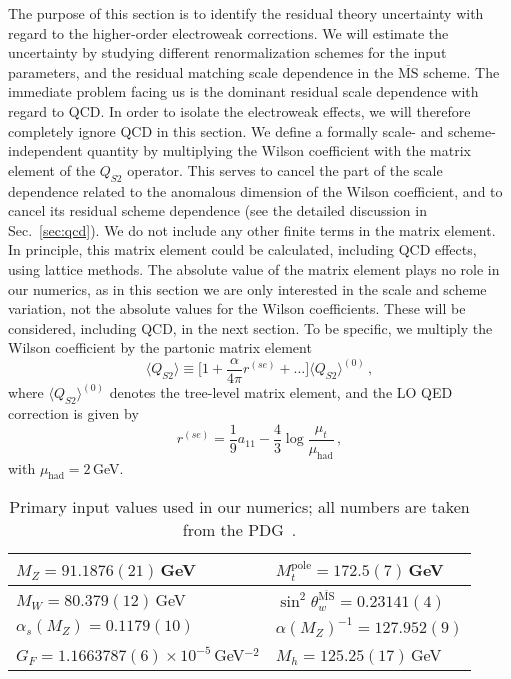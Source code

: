 \documentclass[letter,11pt,DIV=12,abstract=true,numbers=noenddot,titlepage=false,twocolumn=false,draft=false]{scrartcl}
\newcommand{\MS}{$\overline{\text{MS}}$}
\begin{document}
The purpose of this section is to identify the residual theory
uncertainty with regard to the higher-order electroweak
corrections. We will estimate the uncertainty by studying different
renormalization schemes for the input parameters, and the residual
matching scale dependence in the \MS{} scheme. The immediate problem
facing us is the dominant residual scale dependence with regard to
QCD. In order to isolate the electroweak effects, we will therefore
completely ignore QCD in this section. We define a formally scale- and
scheme-independent quantity by multiplying the Wilson coefficient with
the matrix element of the $Q_{S2}$ operator. This serves to cancel the
part of the scale dependence related to the anomalous dimension of the
Wilson coefficient, and to cancel its residual scheme dependence (see
the detailed discussion in Sec.~\ref{sec:qcd}). We do not include any
other finite terms in the matrix element. In principle, this matrix
element could be calculated, including QCD effects, using lattice
methods. The absolute value of the matrix element plays no role in our
numerics, as in this section we are only interested in the scale and
scheme variation, not the absolute values for the Wilson
coefficients. These will be considered, including QCD, in the next
section. To be specific, we multiply the Wilson coefficient by the
partonic matrix element
\begin{equation}\label{eq:ME}
  \langle Q_{S2} \rangle
  \equiv \bigg[ 1 + \frac{\alpha}{4\pi} r^{(se)} + \ldots \bigg]
  \langle Q_{S2} \rangle^{(0)} \,,
\end{equation}
where $\langle Q_{S2} \rangle^{(0)}$ denotes the tree-level matrix
element, and the LO QED correction is given by
\begin{equation}
  r^{(se)} = \frac{1}{9} a_{11} - \frac{4}{3} \log\frac{\mu_t}{\mu_\text{had}}\,,
\end{equation}
with $\mu_\text{had} = 2\,$GeV.


\begin{table}
  \centering
  \begin{tabular}{|l|l|}
    \hline
    $M_Z = 91.1876(21)\,$GeV & $M_t^\text{pole} = 172.5(7)\,$GeV\\\hline
    $M_W = 80.379(12)\,$GeV & $\sin^2\theta_w^{\overline{\text{MS}}} = 0.23141(4)$\\\hline
    $\alpha_s(M_Z) = 0.1179(10)$ & $\alpha(M_Z)^{-1} = 127.952(9)$\\\hline
    $G_F = 1.1663787(6) \times 10^{-5}\,$GeV$^{-2}$ & $M_h = 125.25(17)\,$GeV \\\hline
  \end{tabular}
  \caption{Primary input values used in our numerics; all numbers are
    taken from the PDG~\cite{ParticleDataGroup:2020ssz}.
    \label{tab:input}}
\end{table}
\end{document}
